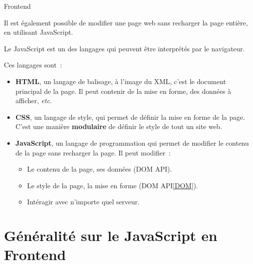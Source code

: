 \documentclass{beamer}
\begin{document}
    \begin{frame}{Frontend}
        \begin{small}
            Il est également possible de modifier une page web sans recharger la page entière, en utilisant JavaScript.

            Le JavaScript est un des langages qui peuvent être interprétés par le navigateur.

            Ces langages sont~:
            \begin{itemize}
                \item \textbf{HTML}, un langage de balisage, à l'image du XML, c'est le document principal de la page.
                Il peut contenir de la mise en forme, des données à afficher, \textit{etc}.
                \item \textbf{CSS}, un langage de style, qui permet de définir la mise en forme de la page.
                C'est une manière \textbf{modulaire} de définir le style de tout un site web.
                \item \textbf{JavaScript}, un langage de programmation qui permet de modifier le contenu de la page sans recharger la page.
                Il peut modifier~:
                \begin{itemize}
                    \item Le contenu de la page, ses données (DOM API\footnotemark{}).
                    \item Le style de la page, la mise en forme (DOM API\cref{DOM}).
                    \item Intéragir avec n'importe quel serveur.
                \end{itemize}
            \end{itemize}
        \end{small}
    \end{frame}


    \section{Généralité sur le JavaScript en Frontend}\label{sec:js-basic}
\end{document}

